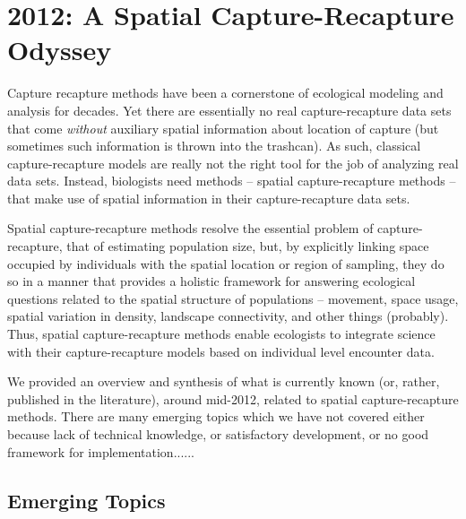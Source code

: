 


\chapter{
 2012: A Spatial Capture-Recapture Odyssey
 }

\label{chapt.final}

\vspace{0.3cm}


\vspace{2in}

Capture recapture methods have been a cornerstone of ecological
modeling and analysis for decades.  Yet there are essentially no real
capture-recapture data sets that come {\it without} auxiliary spatial
information about location of capture (but sometimes such information
is thrown into the trashcan).  As such, classical capture-recapture
models are really not the right tool for the job of analyzing real
data sets. Instead, biologists need methods -- spatial
capture-recapture methods -- that make use of spatial
information in their capture-recapture data sets. 

Spatial capture-recapture methods resolve the essential problem of
capture-recapture, that of estimating population size, but, by
explicitly linking space occupied by individuals with the spatial
location or region of sampling, they do so in a manner that provides a
holistic framework for answering ecological questions related to the
spatial structure of populations -- movement, space usage, spatial
variation in density, landscape connectivity, and other things
(probably).  Thus, spatial capture-recapture methods enable ecologists
to integrate science with their capture-recapture models based on
individual level encounter data.

We provided an overview and synthesis of what is currently known (or,
rather, published in the literature),
around mid-2012, related to spatial capture-recapture methods. There
are many emerging topics which we have not covered either because lack
of technical knowledge, or satisfactory development, or no good
framework for implementation......

\section{Emerging Topics}

